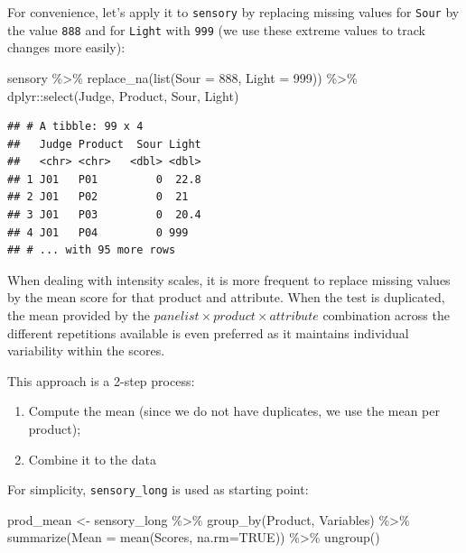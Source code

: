 \documentclass[
]{krantz}
\makeatletter
\newenvironment{Shaded}{\begin{snugshade}}{\end{snugshade}}
\newcommand{\AttributeTok}[1]{\textcolor[rgb]{0.61,0.61,0.61}{#1}}
\newcommand{\ConstantTok}[1]{\textcolor[rgb]{0,0,0}{#1}}
\newcommand{\DecValTok}[1]{\textcolor[rgb]{0.06,0.06,0.06}{#1}}
\newcommand{\FunctionTok}[1]{\textcolor[rgb]{0,0,0}{#1}}
\newcommand{\NormalTok}[1]{#1}
\newcommand{\OtherTok}[1]{\textcolor[rgb]{0.37,0.37,0.37}{#1}}
\newcommand{\SpecialCharTok}[1]{\textcolor[rgb]{0,0,0}{#1}}
\providecommand{\tightlist}{%
  \setlength{\itemsep}{0pt}\setlength{\parskip}{0pt}}
\newenvironment{kframe}{%
\medskip{}
\setlength{\fboxsep}{.8em}
 \def\at@end@of@kframe{}%
 \ifinner\ifhmode%
  \def\at@end@of@kframe{\end{minipage}}%
  \begin{minipage}{\columnwidth}%
 \fi\fi%
 \def\FrameCommand##1{\hskip\@totalleftmargin \hskip-\fboxsep
 \colorbox{shadecolor}{##1}\hskip-\fboxsep
     \hskip-\linewidth \hskip-\@totalleftmargin \hskip\columnwidth}%
 \MakeFramed {\advance\hsize-\width
   \@totalleftmargin\z@ \linewidth\hsize
   \@setminipage}}%
 {\par\unskip\endMakeFramed%
 \at@end@of@kframe}
\renewenvironment{Shaded}{\begin{kframe}}{\end{kframe}}
\makeatother
\begin{document}
For convenience, let's apply it to \texttt{sensory} by replacing missing values for \texttt{Sour} by the value \texttt{888} and for \texttt{Light} with \texttt{999} (we use these extreme values to track changes more easily):

\begin{Shaded}
\begin{Highlighting}[]
\NormalTok{sensory }\SpecialCharTok{\%\textgreater{}\%} 
  \FunctionTok{replace\_na}\NormalTok{(}\FunctionTok{list}\NormalTok{(}\AttributeTok{Sour =} \DecValTok{888}\NormalTok{, }\AttributeTok{Light =} \DecValTok{999}\NormalTok{)) }\SpecialCharTok{\%\textgreater{}\%} 
\NormalTok{  dplyr}\SpecialCharTok{::}\FunctionTok{select}\NormalTok{(Judge, Product, Sour, Light)}
\end{Highlighting}
\end{Shaded}

\begin{verbatim}
## # A tibble: 99 x 4
##   Judge Product  Sour Light
##   <chr> <chr>   <dbl> <dbl>
## 1 J01   P01         0  22.8
## 2 J01   P02         0  21  
## 3 J01   P03         0  20.4
## 4 J01   P04         0 999  
## # ... with 95 more rows
\end{verbatim}

When dealing with intensity scales, it is more frequent to replace missing values by the mean score for that product and attribute. When the test is duplicated, the mean provided by the \(panelist\times{product}\times{attribute}\) combination across the different repetitions available is even preferred as it maintains individual variability within the scores.

This approach is a 2-step process:

\begin{enumerate}
\def\labelenumi{\arabic{enumi}.}
\tightlist
\item
  Compute the mean (since we do not have duplicates, we use the mean per product);
\item
  Combine it to the data
\end{enumerate}

For simplicity, \texttt{sensory\_long} is used as starting point:

\begin{Shaded}
\begin{Highlighting}[]
\NormalTok{prod\_mean }\OtherTok{\textless{}{-}}\NormalTok{ sensory\_long }\SpecialCharTok{\%\textgreater{}\%} 
  \FunctionTok{group\_by}\NormalTok{(Product, Variables) }\SpecialCharTok{\%\textgreater{}\%} 
  \FunctionTok{summarize}\NormalTok{(}\AttributeTok{Mean =} \FunctionTok{mean}\NormalTok{(Scores, }\AttributeTok{na.rm=}\ConstantTok{TRUE}\NormalTok{)) }\SpecialCharTok{\%\textgreater{}\%} 
  \FunctionTok{ungroup}\NormalTok{()}
\end{Highlighting}
\end{Shaded}
\end{document}
